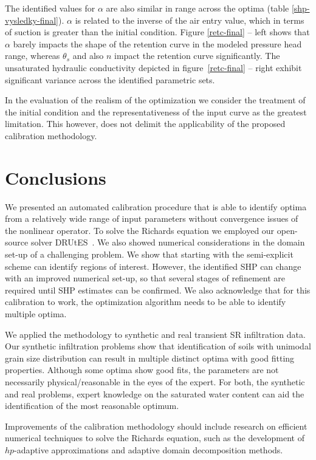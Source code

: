 \documentclass[review,times,3p,10pt]{elsarticle}
\begin{document}
The identified values for $\alpha$ are also similar in range across the optima (table \ref{shp-vysledky-final}). $\alpha$ is related to the inverse of the air entry value, which in terms of suction is greater than the initial condition. Figure \ref{retc-final} -- left shows that $\alpha$ barely impacts the shape of the retention curve in the modeled pressure head range, whereas $\theta_s$ and also $n$ impact the retention curve significantly. {The unsaturated hydraulic conductivity depicted in figure~\ref{retc-final} -- right exhibit significant variance across the identified parametric sets.}

In the evaluation of the realism of the optimization we consider the treatment of the initial condition and the representativeness of the input curve as the greatest limitation. This however, does not delimit the applicability of the proposed calibration methodology. 

 

\section{Conclusions}
\bigskip

We presented an automated calibration procedure that is able to identify optima from a relatively wide range of input parameters without convergence issues of the nonlinear operator.  To solve the Richards equation we employed our open-source solver DRUtES~\citep{drutes}. We also showed numerical considerations in the domain set-up of a challenging problem. We show that starting with the semi-explicit scheme can identify regions of interest. {However, the identified SHP can change  with an improved numerical set-up, so that several stages of refinement are required until SHP estimates can be confirmed.} We also acknowledge that for this calibration to work, the optimization algorithm needs to be able to identify multiple optima. 

We applied the methodology to synthetic and real transient SR infiltration data. Our synthetic infiltration problems show that identification of soils with unimodal grain size distribution can result in multiple distinct optima with good fitting properties. Although some optima show good fits, the parameters are not necessarily physical/reasonable in the eyes of the expert. For both, the synthetic and real problems, expert knowledge on the saturated water content can aid the identification of the most reasonable optimum. 

Improvements of the calibration methodology should include research on efficient numerical techniques to solve the Richards equation, such as the development of $hp$-adaptive approximations and adaptive domain decomposition  methods.
\end{document}
